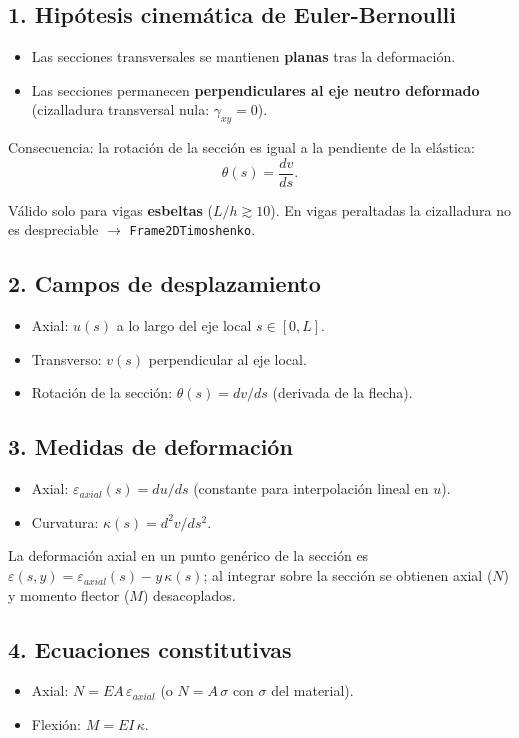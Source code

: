 \documentclass[11pt,letterpaper,oneside]{report}
\begin{document}
\subsection{1. Hipótesis cinemática de Euler-Bernoulli}
\begin{itemize}
  \item Las secciones transversales se mantienen \textbf{planas} tras la deformación.
  \item Las secciones permanecen \textbf{perpendiculares al eje neutro deformado} (cizalladura transversal nula: $\gamma_{xy} = 0$).
\end{itemize}

Consecuencia: la rotación de la sección es igual a la pendiente de la elástica:
\[
\theta(s) = \frac{dv}{ds}.
\]

Válido solo para vigas \textbf{esbeltas} ($L/h \gtrsim 10$). En vigas peraltadas la cizalladura no es despreciable \ensuremath{\to} \texttt{Frame2DTimoshenko}.

\subsection{2. Campos de desplazamiento}
\begin{itemize}
  \item Axial: $u(s)$ a lo largo del eje local $s \in [0, L]$.
  \item Transverso: $v(s)$ perpendicular al eje local.
  \item Rotación de la sección: $\theta(s) = dv/ds$ (derivada de la flecha).
\end{itemize}

\subsection{3. Medidas de deformación}
\begin{itemize}
  \item Axial: $\varepsilon_{axial}(s) = du/ds$ (constante para interpolación lineal en $u$).
  \item Curvatura: $\kappa(s) = d^2v/ds^2$.
\end{itemize}

La deformación axial en un punto genérico de la sección es $\varepsilon(s, y) = \varepsilon_{axial}(s) - y\,\kappa(s)$; al integrar sobre la sección se obtienen axial ($N$) y momento flector ($M$) desacoplados.

\subsection{4. Ecuaciones constitutivas}
\begin{itemize}
  \item Axial: $N = EA\,\varepsilon_{axial}$ (o $N = A\,\sigma$ con $\sigma$ del material).
  \item Flexión: $M = EI\,\kappa$.
\end{itemize}
\end{document}
